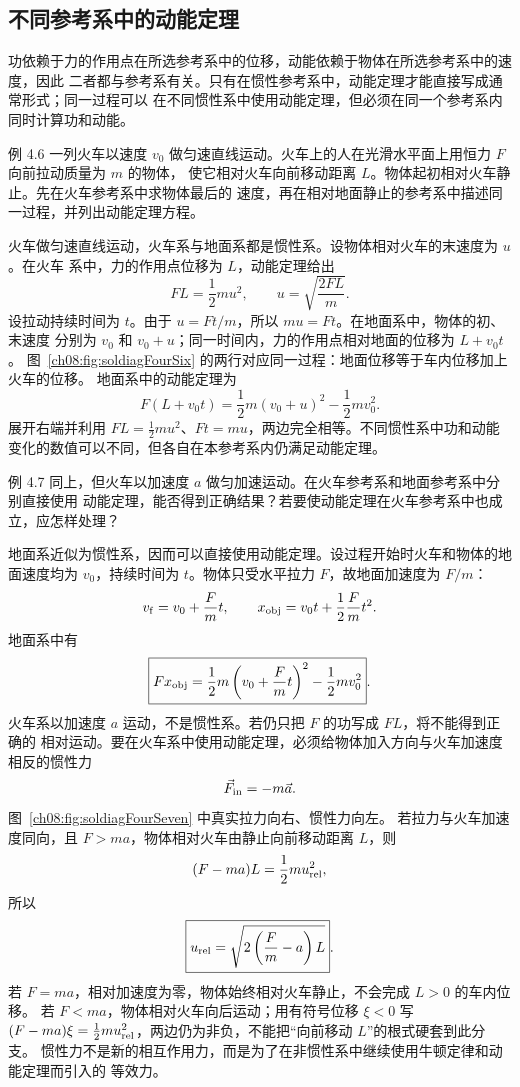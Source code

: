 \subsection{不同参考系中的动能定理}

功依赖于力的作用点在所选参考系中的位移，动能依赖于物体在所选参考系中的速度，因此
二者都与参考系有关。只有在惯性参考系中，动能定理才能直接写成通常形式；同一过程可以
在不同惯性系中使用动能定理，但必须在同一个参考系内同时计算功和动能。

\begin{origexamplebox}{例 4.6}
一列火车以速度 $v_0$ 做匀速直线运动。火车上的人在光滑水平面上用恒力 $F$ 向前拉动质量为 $m$ 的物体，
使它相对火车向前移动距离 $L$。物体起初相对火车静止。先在火车参考系中求物体最后的
速度，再在相对地面静止的参考系中描述同一过程，并列出动能定理方程。
\end{origexamplebox}

\begin{xesolution}
火车做匀速直线运动，火车系与地面系都是惯性系。设物体相对火车的末速度为 $u$。在火车
系中，力的作用点位移为 $L$，动能定理给出
\[
 FL=\frac12mu^2,
 \qquad
 \boxed{u=\sqrt{\frac{2FL}{m}}}.
\]
设拉动持续时间为 $t$。由于 $u=Ft/m$，所以 $m u=Ft$。在地面系中，物体的初、末速度
分别为 $v_0$ 和 $v_0+u$；同一时间内，力的作用点相对地面的位移为 $L+v_0t$。
\soldiagFourSix
图~\ref{ch08:fig:soldiagFourSix} 的两行对应同一过程：地面位移等于车内位移加上火车的位移。
地面系中的动能定理为
\[
 \boxed{
 F(L+v_0t)
 =\frac12m(v_0+u)^2-\frac12mv_0^2}.
\]
展开右端并利用 $FL=\tfrac12mu^2$、$Ft=mu$，两边完全相等。不同惯性系中功和动能
变化的数值可以不同，但各自在本参考系内仍满足动能定理。
\end{xesolution}

\Needspace{0.30\textheight}
\begin{origexamplebox}{例 4.7}
同上，但火车以加速度 $a$ 做匀加速运动。在火车参考系和地面参考系中分别直接使用
动能定理，能否得到正确结果？若要使动能定理在火车参考系中也成立，应怎样处理？
\end{origexamplebox}

\begin{xesolution}
地面系近似为惯性系，因而可以直接使用动能定理。设过程开始时火车和物体的地面速度均为
$v_0$，持续时间为 $t$。物体只受水平拉力 $F$，故地面加速度为 $F/m$：
\[
 v_{\rm f}=v_0+\frac{F}{m}t,
 \qquad
 x_{\rm obj}=v_0t+\frac12\frac{F}{m}t^2.
\]
地面系中有
\[
 \boxed{
 Fx_{\rm obj}
 =\frac12m\left(v_0+\frac{F}{m}t\right)^2-\frac12mv_0^2}.
\]
火车系以加速度 $a$ 运动，不是惯性系。若仍只把 $F$ 的功写成 $FL$，将不能得到正确的
相对运动。要在火车系中使用动能定理，必须给物体加入方向与火车加速度相反的惯性力
\[
 \vec F_{\rm in}=-m\vec a.
\]
\soldiagFourSeven
图~\ref{ch08:fig:soldiagFourSeven} 中真实拉力向右、惯性力向左。
若拉力与火车加速度同向，且 $F>ma$，物体相对火车由静止向前移动距离 $L$，则
\[
 (F-ma)L=\frac12mu_{\rm rel}^2,
\]
所以
\[
 \boxed{u_{\rm rel}
 =\sqrt{2\left(\frac{F}{m}-a\right)L}}.
\]
若 $F=ma$，相对加速度为零，物体始终相对火车静止，不会完成 $L>0$ 的车内位移。
若 $F<ma$，物体相对火车向后运动；用有符号位移 $\xi<0$ 写
$(F-ma)\xi=\tfrac12mu_{\rm rel}^2$，两边仍为非负，不能把“向前移动 $L$”的根式硬套到此分支。
惯性力不是新的相互作用力，而是为了在非惯性系中继续使用牛顿定律和动能定理而引入的
等效力。
\end{xesolution}

